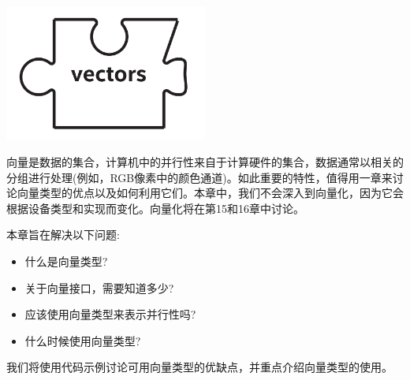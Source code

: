 \begin{center}
	\includegraphics[width=0.5\textwidth]{content/chapter-11/images/1}
\end{center}

向量是数据的集合，计算机中的并行性来自于计算硬件的集合，数据通常以相关的分组进行处理(例如，RGB像素中的颜色通道)。如此重要的特性，值得用一章来讨论向量类型的优点以及如何利用它们。本章中，我们不会深入到向量化，因为它会根据设备类型和实现而变化。向量化将在第15和16章中讨论。\par

本章旨在解决以下问题:\par

\begin{itemize}
	\item 什么是向量类型?
	\item 关于向量接口，需要知道多少?
	\item 应该使用向量类型来表示并行性吗?
	\item 什么时候使用向量类型?
\end{itemize}

我们将使用代码示例讨论可用向量类型的优缺点，并重点介绍向量类型的使用。\par




























